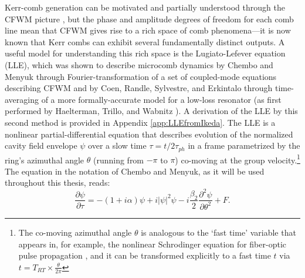 Kerr-comb generation can be motivated and partially understood through the CFWM picture \cite{Herr2012}, but the phase and amplitude degrees of freedom for each comb line mean that CFWM gives rise to a rich space of comb phenomena---it is now known that Kerr combs can exhibit several fundamentally distinct outputs.  A useful model for understanding this rich space is the Lugiato-Lefever equation (LLE), which was shown to describe microcomb dynamics by Chembo and Menyuk \cite{Chembo2013} through Fourier-transformation of a set of coupled-mode equations describing CFWM and by Coen, Randle, Sylvestre, and Erkintalo \cite{Coen2013a} through time-averaging of a more formally-accurate model for a low-loss resonator (as first performed by Haelterman, Trillo, and Wabnitz \cite{Haelterman1992a}). A derivation of the LLE by this second method is provided in Appendix \ref{app:LLEfromIkeda}. The LLE is a nonlinear partial-differential equation that describes evolution of the normalized cavity field envelope $\psi$ over a slow time $\tau=t/2\tau_{ph}$ in a frame parametrized by the ring's azimuthal angle $\theta$ (running from $-\pi$ to $\pi$) co-moving at the group velocity.\footnote{The co-moving azimuthal angle $\theta$ is analogous to the `fast time' variable that appears in, for example, the nonlinear Schrodinger equation for fiber-optic pulse propagation \cite{Agrawal2007}, and it can be transformed explicitly to a fast time $t$ via $t=T_{RT}\times\frac{\theta}{2\pi}$} The equation in the notation of Chembo and Menyuk, as it will be used throughout this thesis, reads:
\begin{equation}
\frac{\partial \psi}{\partial \tau}=-(1+i \alpha) \psi + i|\psi|^2 \psi -i \frac{\beta_2}{2} \frac{\partial^2 \psi}{\partial \theta^2} +F. \label{eq:LLE}
\end{equation}

